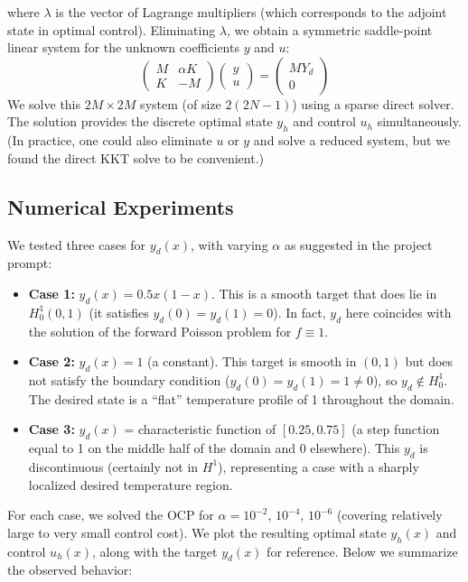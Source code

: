 \documentclass{article}
\begin{document}
where $\lambda$ is the vector of Lagrange multipliers (which corresponds to the adjoint state in optimal control). Eliminating $\lambda$, we obtain a symmetric saddle-point linear system for the unknown coefficients $y$ and $u$:
\begin{equation}
\begin{pmatrix} M & \alpha K \\[6pt] K & -M \end{pmatrix} 
\begin{pmatrix} y \\[3pt] u \end{pmatrix} = 
\begin{pmatrix} MY_d \\[3pt] 0 \end{pmatrix}
\end{equation}
We solve this $2M \times 2M$ system (of size $2(2N-1)$) using a sparse direct solver. The solution provides the discrete optimal state $y_h$ and control $u_h$ simultaneously. (In practice, one could also eliminate $u$ or $y$ and solve a reduced system, but we found the direct KKT solve to be convenient.)

\subsection{Numerical Experiments}
We tested three cases for $y_d(x)$, with varying $\alpha$ as suggested in the project prompt:

\begin{itemize}
\item \textbf{Case 1:} $y_d(x) = 0.5x(1-x)$. This is a smooth target that does lie in $H^1_0(0,1)$ (it satisfies $y_d(0)=y_d(1)=0$). In fact, $y_d$ here coincides with the solution of the forward Poisson problem for $f\equiv 1$.
\item \textbf{Case 2:} $y_d(x) = 1$ (a constant). This target is smooth in $(0,1)$ but does not satisfy the boundary condition ($y_d(0)=y_d(1)=1\neq0$), so $y_d\notin H^1_0$. The desired state is a “flat” temperature profile of 1 throughout the domain.
\item \textbf{Case 3:} $y_d(x)$ = characteristic function of $[0.25,0.75]$ (a step function equal to 1 on the middle half of the domain and 0 elsewhere). This $y_d$ is discontinuous (certainly not in $H^1$), representing a case with a sharply localized desired temperature region.
\end{itemize}

For each case, we solved the OCP for $\alpha = 10^{-2},\,10^{-4},\,10^{-6}$ (covering relatively large to very small control cost). We plot the resulting optimal state $y_h(x)$ and control $u_h(x)$, along with the target $y_d(x)$ for reference. Below we summarize the observed behavior:
\end{document}
